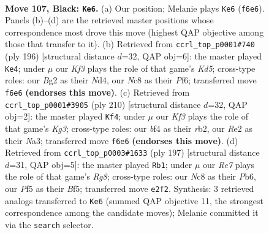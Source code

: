 \documentclass[11pt]{article}
\begin{document}
\clearpage

\begin{figure}[p]\centering
\begin{subfigure}{0.46\textwidth}\centering
\resizebox{\linewidth}{!}{%
\newchessgame
\chessboard[
  setfen={2n2K2/8/p4k2/P4p1p/5B2/N5P1/4r1b1/R7 b - - 25 107},
  showmover=false,
  pgfstyle=straightmove, color=movearrow, markmove={f6-e6}
]}
\caption{}
\end{subfigure}\hfill
\begin{subfigure}{0.46\textwidth}\centering
\resizebox{\linewidth}{!}{%
\newchessgame
\chessboard[
  setfen={6k1/5p2/5P2/p2K2P1/Pb1N3R/8/8/3r4 w - - 18 99},
  showmover=false,
  pgfstyle=straightmove, color=movearrow, markmove={d5-e4}
]}
\caption{}
\end{subfigure}
\\[4pt]
\begin{subfigure}{0.46\textwidth}\centering
\resizebox{\linewidth}{!}{%
\newchessgame
\chessboard[
  setfen={8/5k2/R3b2p/5p2/7P/N3PPK1/1r6/8 w - - 49 106},
  showmover=false,
  pgfstyle=straightmove, color=movearrow, markmove={g3-f4}
]}
\caption{}
\end{subfigure}\hfill
\begin{subfigure}{0.46\textwidth}\centering
\resizebox{\linewidth}{!}{%
\newchessgame
\chessboard[
  setfen={8/p7/PpB5/1P2kb2/2P5/K7/3R4/6r1 b - - 42 99},
  showmover=false,
  pgfstyle=straightmove, color=movearrow, markmove={g1-b1}
]}
\caption{}
\end{subfigure}
\caption{\textbf{Move 107, Black: \texttt{Ke6}.} (a) Our position; Melanie plays \texttt{Ke6} (\texttt{f6e6}). Panels (b)--(d) are the retrieved master positions whose correspondence most drove this move (highest QAP objective among those that transfer to it). (b) Retrieved from \texttt{ccrl\_top\_p0001\#740} (ply 196) [structural distance $d$=32, QAP obj=6]: the master played \texttt{Ke4}; under $\mu$ our \emph{Kf3} plays the role of that game's \emph{Kd5}; cross-type roles: our \emph{B}g2 as their \emph{N}d4, our \emph{N}c8 as their \emph{P}f6; transferred move \texttt{f6e6} \textbf{(endorses this move)}. (c) Retrieved from \texttt{ccrl\_top\_p0001\#3905} (ply 210) [structural distance $d$=32, QAP obj=2]: the master played \texttt{Kf4}; under $\mu$ our \emph{Kf3} plays the role of that game's \emph{Kg3}; cross-type roles: our \emph{b}f4 as their \emph{r}b2, our \emph{R}e2 as their \emph{N}a3; transferred move \texttt{f6e6} \textbf{(endorses this move)}. (d) Retrieved from \texttt{ccrl\_top\_p0003\#1633} (ply 197) [structural distance $d$=31, QAP obj=5]: the master played \texttt{Rb1}; under $\mu$ our \emph{Re7} plays the role of that game's \emph{Rg8}; cross-type roles: our \emph{N}c8 as their \emph{P}b6, our \emph{P}f5 as their \emph{B}f5; transferred move \texttt{e2f2}. Synthesis: 3 retrieved analogs transferred to \texttt{Ke6} (summed QAP objective 11, the strongest correspondence among the candidate moves); Melanie committed it via the \texttt{search} selector.}
\label{fig:thought-m213}
\end{figure}
\end{document}
